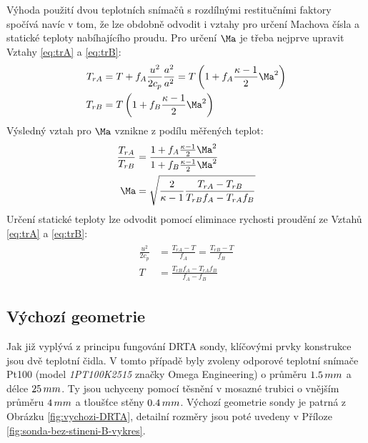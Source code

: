         Výhoda použití dvou teplotních snímačů s rozdílnými restitučními faktory spočívá navíc v tom, že lze obdobně odvodit i vztahy pro určení Machova čísla a statické teploty nabíhajícího proudu. Pro určení $\Ma$ je třeba nejprve upravit Vztahy \ref{eq:trA} a \ref{eq:trB}:
        \begin{align}
            \begin{split}
                T_{rA} &= T + f_A \frac{u^2}{2 c_p} \frac{a^2}{a^2} = T \brac{1 + f_A \frac{\kappa - 1}{2} \Ma ^2} \\
                T_{rB} &=  T \brac{1 + f_B \frac{\kappa - 1}{2} \Ma ^2}
            \end{split}
        \end{align}
        \noindent Výsledný vztah pro $\Ma$ vznikne z podílu měřených teplot:
        \begin{align}
            \begin{split}
                \frac{T_{rA}}{T_{rB}} &= \frac{1 + f_A \frac{\kappa - 1}{2} \Ma ^2}{1 + f_B \frac{\kappa - 1}{2} \Ma ^2} \\
                \Ma &= \sqrt{\frac{2}{\kappa - 1} \frac{T_{rA}-T_{rB}}{T_{rB} f_A - T_{rA} f_B}}
            \end{split}
        \end{align}
        \noindent Určení statické teploty lze odvodit pomocí eliminace rychosti proudění ze Vztahů \ref{eq:trA} a \ref{eq:trB}:
        \begin{align}
            \begin{split}
                \frac{u^2}{2 c_p} &= \frac{T_{rA} - T}{f_A} = \frac{T_{rB} - T}{f_B} \\
                T &= \frac{T_{rB} f_A - T_{rA} f_B}{f_A - f_B}
            \end{split}
        \end{align}

    \subsection{Výchozí geometrie}
        Jak již vyplývá z principu fungování DRTA sondy, klíčovými prvky konstrukce jsou dvě teplotní čidla. V tomto případě byly zvoleny odporové teplotní snímače Pt100 (model \textit{1PT100K2515} značky Omega Engineering) o průměru $1.5 \, mm$ a délce $25 \, mm$. Ty jsou uchyceny pomocí těsnění v mosazné trubici o vnějším průměru $4 \, mm$ a tloušťce stěny $0.4 \, mm$. Výchozí geometrie sondy je patrná z Obrázku \ref{fig:vychozi-DRTA}, detailní rozměry jsou poté uvedeny v Příloze \ref{fig:sonda-bez-stineni-B-vykres}.


